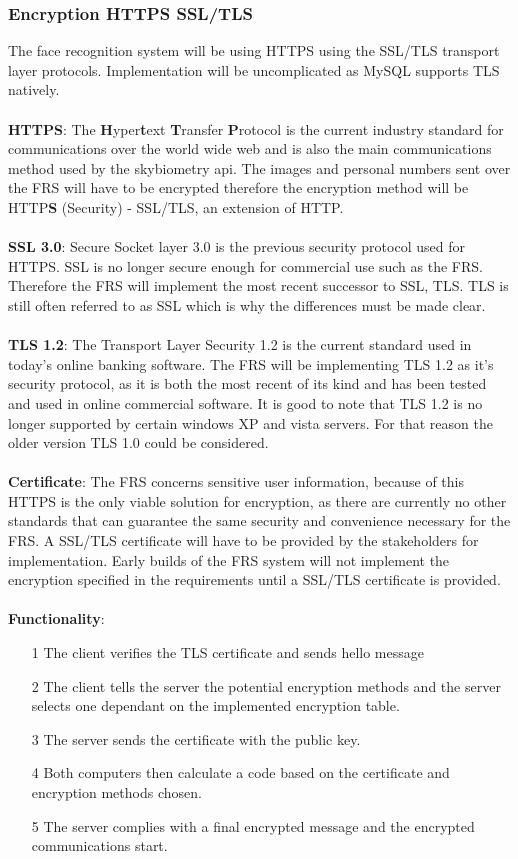 \documentclass[a4paper,11pt]{article}
\begin{document}
\subsubsection{Encryption HTTPS SSL/TLS}
The face recognition system will be using HTTPS using the SSL/TLS transport layer protocols. Implementation will be uncomplicated as MySQL supports TLS natively. 
\\\\
\textbf{HTTPS}: The \textbf{H}yper\textbf{t}ext \textbf{T}ransfer \textbf{P}rotocol  is the current industry standard for communications over the world wide web and is also the main communications method used by the skybiometry api. The images and personal numbers sent over the FRS will have to be encrypted therefore the encryption method will be HTTP\textbf{S} (Security) - SSL/TLS, an extension of HTTP.
\\\\
\textbf{SSL 3.0}: Secure Socket layer 3.0 is the previous security protocol used for HTTPS. SSL is no longer secure enough for commercial use such as the FRS. Therefore the FRS will implement the most recent successor to SSL, TLS. TLS is still often referred to as SSL which is why the differences must be made clear.
\\\\
\textbf{TLS 1.2}: The Transport Layer Security 1.2 is the current standard used in today's online banking software. The FRS will be implementing TLS 1.2 as it’s security protocol, as it is both the most recent of its kind and has been tested and used in online commercial software. It is good to note that TLS 1.2 is no longer supported by certain windows XP and vista servers. For that reason the older version TLS 1.0 could be considered.
\\\\
\textbf{Certificate}: The FRS concerns sensitive user information, because of this HTTPS is the only viable solution for encryption, as there are currently no other standards that can guarantee the same security and convenience necessary for the FRS. A SSL/TLS certificate will have to be provided by the stakeholders for implementation. Early builds of the FRS system will not implement the encryption specified in the requirements until a SSL/TLS certificate is provided. 
\\\\
\textbf{Functionality}:
\begin{itemize}
\item[1] The client verifies the TLS certificate and sends hello message
\item[2] The client tells the server the potential encryption methods and the server selects one dependant on the implemented encryption table.
\item[3] The server sends the certificate with the public key.
\item[4] Both computers then calculate a code based on the certificate and encryption methods chosen.
\item[5] The server complies with a final encrypted message and the encrypted communications start.
\end{itemize}
\end{document}
